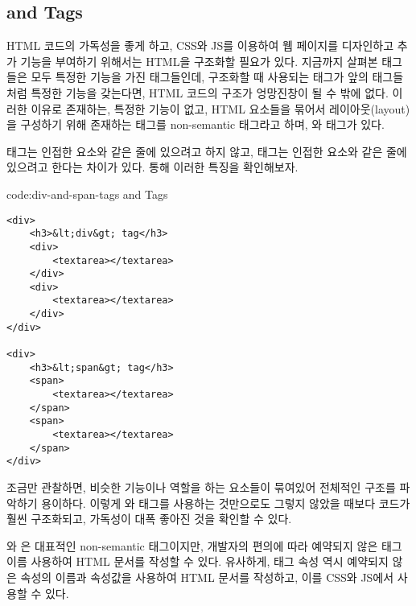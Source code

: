 \subsection*{ and  Tags}
HTML 코드의 가독성을 좋게 하고, CSS와 JS를 이용하여 웹 페이지를 디자인하고 추가 기능을 부여하기 위해서는 HTML을 구조화할 필요가 있다. 지금까지 살펴본 태그들은 모두 특정한 기능을 가진 태그들인데, 구조화할 때 사용되는 태그가 앞의 태그들처럼 특정한 기능을 갖는다면, HTML 코드의 구조가 엉망진창이 될 수 밖에 없다. 이러한 이유로 존재하는, 특정한 기능이 없고, HTML 요소들을 묶어서 레이아웃(layout)을 구성하기 위해 존재하는 태그를 non-semantic 태그라고 하며, 와  태그가 있다.

 태그는 인접한 요소와 같은 줄에 있으려고 하지 않고,  태그는 인접한 요소와 같은 줄에 있으려고 한다는 차이가 있다. \를 통해 이러한 특징을 확인해보자.

\begin{codeenv}{code:div-and-span-tags}{ and  Tags}\begin{verbatim}
<div>
    <h3>&lt;div&gt; tag</h3>
    <div>
        <textarea></textarea>
    </div>
    <div>
        <textarea></textarea>
    </div>
</div>

<div>
    <h3>&lt;span&gt; tag</h3>
    <span>
        <textarea></textarea>
    </span>
    <span>
        <textarea></textarea>
    </span>
</div>
\end{verbatim}
\end{codeenv}

\를 조금만 관찰하면, 비슷한 기능이나 역할을 하는 요소들이 묶여있어 전체적인 구조를 파악하기 용이하다. 이렇게 와  태그를 사용하는 것만으로도 그렇지 않았을 때보다 코드가 훨씬 구조화되고, 가독성이 대폭 좋아진 것을 확인할 수 있다.

와 은 대표적인 non-semantic 태그이지만, 개발자의 편의에 따라 예약되지 않은 태그 이름 사용하여 HTML 문서를 작성할 수 있다. 유사하게, 태그 속성 역시 예약되지 않은 속성의 이름과 속성값을 사용하여 HTML 문서를 작성하고, 이를 CSS와 JS에서 사용할 수 있다.
